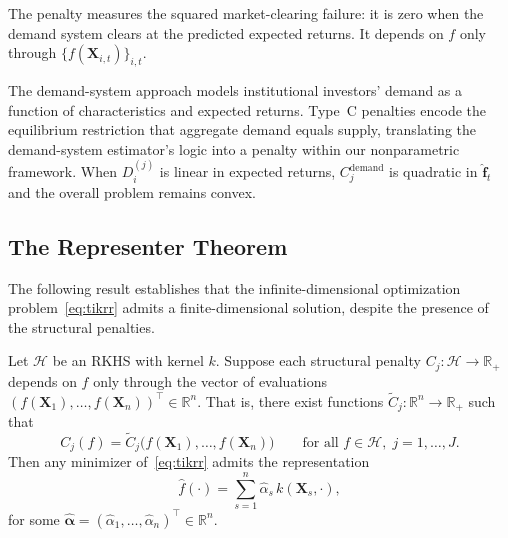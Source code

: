 \noindent
The penalty measures the squared market-clearing failure:
it is zero when the demand system clears at the predicted expected returns.
It depends on $f$ only through $\{f(\mathbf{X}_{i,t})\}_{i,t}$.

\begin{remark}
The demand-system approach models institutional
investors' demand as a function of characteristics and expected returns.
Type~C penalties encode the equilibrium restriction that aggregate demand
equals supply, translating the demand-system estimator's logic into a
penalty within our nonparametric framework.
When $D_i^{(j)}$ is linear in expected returns, $C_j^{\mathrm{demand}}$
is quadratic in $\hat{\mathbf{f}}_t$ and the overall problem remains convex.
\end{remark}

\subsection{The Representer Theorem}
\label{sub:representer}

The following result establishes that the infinite-dimensional
optimization problem~\eqref{eq:tikrr} admits a finite-dimensional
solution, despite the presence of the structural penalties.

\begin{proposition}
\label{prop:representer}
Let $\mathcal{H}$ be an RKHS with kernel $k$.
Suppose each structural penalty $C_j: \mathcal{H} \to \mathbb{R}_+$
depends on $f$ only through the vector of evaluations
$(f(\mathbf{X}_1), \ldots, f(\mathbf{X}_n))^\top \in \mathbb{R}^n$.
That is, there exist functions $\tilde{C}_j: \mathbb{R}^n \to \mathbb{R}_+$
such that
\begin{equation}
\label{eq:penalty_eval}
C_j(f) = \tilde{C}_j\bigl(f(\mathbf{X}_1), \ldots, f(\mathbf{X}_n)\bigr)
\qquad \text{for all } f \in \mathcal{H}, \; j = 1, \ldots, J.
\end{equation}
Then any minimizer of~\eqref{eq:tikrr} admits the representation
\begin{equation}
\label{eq:representer}
\hat{f}(\cdot) = \sum_{s=1}^{n} \hat{\alpha}_s\, k(\mathbf{X}_s, \cdot),
\end{equation}
for some $\hat{\boldsymbol{\alpha}} = (\hat{\alpha}_1, \ldots, \hat{\alpha}_n)^\top
\in \mathbb{R}^n$.
\end{proposition}

